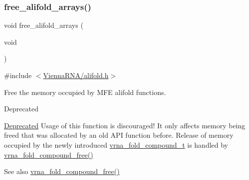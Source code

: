 \subsubsection{\texorpdfstring{free\+\_\+alifold\+\_\+arrays()}{free\_alifold\_arrays()}}
{\footnotesize\ttfamily void free\+\_\+alifold\+\_\+arrays (\begin{DoxyParamCaption}\item[{void}]{ }\end{DoxyParamCaption})}



{\ttfamily \#include $<$\hyperlink{alifold_8h}{Vienna\+R\+N\+A/alifold.\+h}$>$}



Free the memory occupied by M\+FE alifold functions. 

\begin{DoxyRefDesc}{Deprecated}
\item[\hyperlink{deprecated__deprecated000014}{Deprecated}]Usage of this function is discouraged! It only affects memory being free\textquotesingle{}d that was allocated by an old A\+PI function before. Release of memory occupied by the newly introduced \hyperlink{group__fold__compound_ga1b0cef17fd40466cef5968eaeeff6166}{vrna\+\_\+fold\+\_\+compound\+\_\+t} is handled by \hyperlink{group__fold__compound_gadded6039d63f5d6509836e20321534ad}{vrna\+\_\+fold\+\_\+compound\+\_\+free()}\end{DoxyRefDesc}


\begin{DoxySeeAlso}{See also}
\hyperlink{group__fold__compound_gadded6039d63f5d6509836e20321534ad}{vrna\+\_\+fold\+\_\+compound\+\_\+free()} 
\end{DoxySeeAlso}

